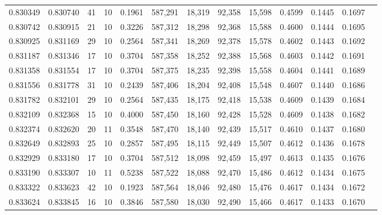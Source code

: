 \begin{tabular}{rrrrrrrrrrrrr}
0.830349 & 0.830740 &    41 &  10 &                                     0.1961 & 587,291 &  18,319 &  92,358 &  15,598 & 0.4599 & 0.1445 & 0.1697 \\
0.830742 & 0.830915 &    21 &  10 &                                     0.3226 & 587,312 &  18,298 &  92,368 &  15,588 & 0.4600 & 0.1444 & 0.1695 \\
0.830925 & 0.831169 &    29 &  10 &                                     0.2564 & 587,341 &  18,269 &  92,378 &  15,578 & 0.4602 & 0.1443 & 0.1692 \\
0.831187 & 0.831346 &    17 &  10 &                                     0.3704 & 587,358 &  18,252 &  92,388 &  15,568 & 0.4603 & 0.1442 & 0.1691 \\
0.831358 & 0.831554 &    17 &  10 &                                     0.3704 & 587,375 &  18,235 &  92,398 &  15,558 & 0.4604 & 0.1441 & 0.1689 \\
0.831556 & 0.831778 &    31 &  10 &                                     0.2439 & 587,406 &  18,204 &  92,408 &  15,548 & 0.4607 & 0.1440 & 0.1686 \\
0.831782 & 0.832101 &    29 &  10 &                                     0.2564 & 587,435 &  18,175 &  92,418 &  15,538 & 0.4609 & 0.1439 & 0.1684 \\
0.832109 & 0.832368 &    15 &  10 &                                     0.4000 & 587,450 &  18,160 &  92,428 &  15,528 & 0.4609 & 0.1438 & 0.1682 \\
0.832374 & 0.832620 &    20 &  11 &                                     0.3548 & 587,470 &  18,140 &  92,439 &  15,517 & 0.4610 & 0.1437 & 0.1680 \\
0.832649 & 0.832893 &    25 &  10 &                                     0.2857 & 587,495 &  18,115 &  92,449 &  15,507 & 0.4612 & 0.1436 & 0.1678 \\
0.832929 & 0.833180 &    17 &  10 &                                     0.3704 & 587,512 &  18,098 &  92,459 &  15,497 & 0.4613 & 0.1435 & 0.1676 \\
0.833190 & 0.833307 &    10 &  11 &                                     0.5238 & 587,522 &  18,088 &  92,470 &  15,486 & 0.4612 & 0.1434 & 0.1675 \\
0.833322 & 0.833623 &    42 &  10 &                                     0.1923 & 587,564 &  18,046 &  92,480 &  15,476 & 0.4617 & 0.1434 & 0.1672 \\
0.833624 & 0.833845 &    16 &  10 &                                     0.3846 & 587,580 &  18,030 &  92,490 &  15,466 & 0.4617 & 0.1433 & 0.1670 \\

\end{tabular}

